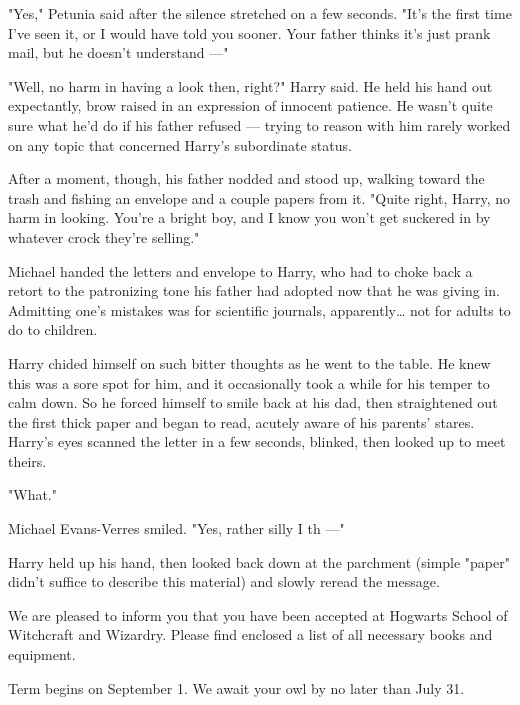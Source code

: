 "Yes," Petunia said after the silence stretched on a few
seconds. "It's the first time I've seen it, or I would have
told you sooner. Your father thinks it's just prank mail, but
he doesn't understand ---"

"Well, no harm in having a look then, right?" Harry said.
He held his hand out expectantly, brow raised in an
expression of innocent patience. He wasn't quite sure what
he'd do if his father refused --- trying to reason with him
rarely worked on any topic that concerned Harry's
subordinate status.

After a moment, though, his father nodded and stood up,
walking toward the trash and fishing an envelope and a
couple papers from it. "Quite right, Harry, no harm in
looking. You're a bright boy, and I know you won't get
suckered in by whatever crock they're selling."

Michael handed the letters and envelope to Harry, who
had to choke back a retort to the patronizing tone his
father had adopted now that he was giving in. Admitting
one's mistakes was for scientific journals, apparently{\ldots} not
for adults to do to children.

Harry chided himself on such bitter thoughts as he went
to the table. He knew this was a sore spot for him, and it
occasionally took a while for his temper to calm down. So
he forced himself to smile back at his dad, then
straightened out the first thick paper and began to
read, acutely aware of his parents' stares.
Harry's eyes scanned the letter in a few seconds, blinked,
then looked up to meet theirs.

"What."

Michael Evans-Verres smiled. "Yes, rather silly I th ---"

Harry held up his hand, then looked back down at the
parchment (simple "paper" didn't suffice to describe this material)
and slowly reread the message.

\begin{writtenNote}

We are pleased to inform you that you have been
accepted at Hogwarts School of Witchcraft and Wizardry.
Please find enclosed a list of all necessary books and
equipment.

Term begins on September 1. We await your owl by no
later than July 31.


\end{writtenNote}

